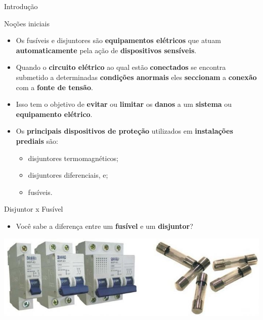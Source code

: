 \begin{frame}{Introdução}
	\begin{block}{Noções iniciais}
		\begin{itemize}
			\item Os fusíveis e disjuntores são \textbf{equipamentos elétricos} que atuam \textbf{automaticamente} pela ação de \textbf{dispositivos sensíveis}.
			\item Quando o \textbf{circuito elétrico} ao qual estão \textbf{conectados} se encontra submetido a determinadas \textbf{condições anormais} eles \textbf{seccionam} a \textbf{conexão} com a \textbf{fonte de tensão}.
			\item Isso tem o objetivo de \textbf{evitar} ou \textbf{limitar} os \textbf{danos} a um \textbf{sistema} ou \textbf{equipamento elétrico}.
			\item Os \textbf{principais dispositivos de proteção} utilizados em \textbf{instalações prediais} são:
			      \begin{itemize}
				      \item\normalsize disjuntores termomagnéticos;
				      \item\normalsize disjuntores diferenciais, e;
				      \item\normalsize fusíveis.
			      \end{itemize}
		\end{itemize}
	\end{block}
\end{frame}


\begin{frame}{Disjuntor x Fusível}
	\begin{block}{}
		\begin{itemize}
			\item Você sabe a diferença entre um \textbf{fusível} e um \textbf{disjuntor}?

		\end{itemize}
	\end{block}

	\bigskip

	\centering
	\includegraphics[width=1\linewidth]{Figuras/Ch04/fig6}
\end{frame}


